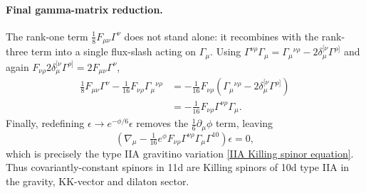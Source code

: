 \paragraph{Final gamma-matrix reduction.}
The rank-one term $\tfrac18 F_{\mu\nu}\Gamma^\nu$ does not stand alone: it recombines with the rank-three term into a single flux-slash acting on $\Gamma_\mu$. Using $\Gamma^{\nu\rho}\Gamma_\mu=\Gamma_\mu{}^{\nu\rho}-2\delta_\mu^{[\nu}\Gamma^{\rho]}$ and again $F_{\nu\rho} 2\delta_\mu^{[\nu}\Gamma^{\rho]}=2F_{\mu\nu}\Gamma^\nu$,
\begin{align}
\tfrac{1}{8}F_{\mu\nu}\Gamma^\nu-\tfrac{1}{16}F_{\nu\rho}\Gamma_\mu{}^{\nu\rho}
&=-\tfrac{1}{16}F_{\nu\rho}\left(\Gamma_\mu{}^{\nu\rho}-2\delta_\mu^{[\nu}\Gamma^{\rho]}\right)\\
&=-\tfrac{1}{16}F_{\nu\rho} \Gamma^{\nu\rho}\Gamma_\mu .
\end{align}
Finally, redefining $\epsilon\to e^{-\phi/6}\epsilon$ removes the $\tfrac16\partial_\mu\phi$ term, leaving
\begin{equation}
\left(
\nabla_\mu -\tfrac{1}{16}e^\phi F_{\nu\rho} \Gamma^{\nu\rho}\Gamma_\mu  \Gamma^{10}
\right)\epsilon=0 ,
\end{equation}
which is precisely the type IIA gravitino variation \eqref{IIA Killing spinor equation}. Thus covariantly-constant spinors in 11d are Killing spinors of 10d type IIA in the gravity, KK-vector and dilaton sector.
